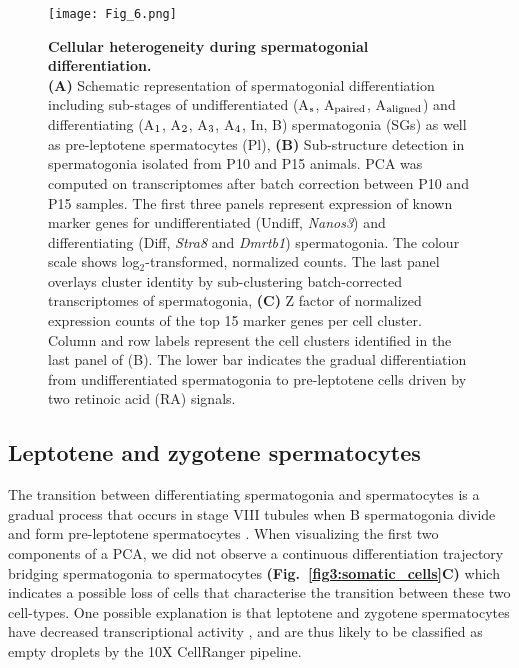 \begin{figure}[!h]
\centering
\texttt{[image: Fig\_6.png]}
\caption[Cellular heterogeneity during spermatogonial differentiation]{\textbf{Cellular heterogeneity during spermatogonial differentiation.}\\
\textbf{(A)} Schematic representation of spermatogonial differentiation including sub-stages of undifferentiated (A$_\textnormal{s}$, A$_\textnormal{paired}$, A$_\textnormal{aligned}$) and differentiating (A$_\textnormal{1}$, A$_\textnormal{2}$, A$_\textnormal{3}$, A$_\textnormal{4}$, In, B) spermatogonia (SGs) as well as pre-leptotene spermatocytes (Pl), \textbf{(B)} Sub-structure detection in spermatogonia isolated from P10 and P15 animals. PCA was computed on transcriptomes after batch correction between P10 and P15 samples. The first three panels represent expression of known marker genes for undifferentiated (Undiff, \textit{Nanos3}) and differentiating (Diff, \textit{Stra8} and \textit{Dmrtb1}) spermatogonia. The colour scale shows log$_2$-transformed, normalized counts. The last panel overlays cluster identity by sub-clustering batch-corrected transcriptomes of spermatogonia, \textbf{(C)} Z factor of normalized expression counts of the top 15 marker genes per cell cluster. Column and row labels represent the cell clusters identified in the last panel of (B). The lower bar indicates the gradual differentiation from undifferentiated spermatogonia to pre-leptotene cells driven by two retinoic acid (RA) signals. }
\label{fig3:spermatogonia}
\end{figure}

\newpage

\subsection{Leptotene and zygotene spermatocytes}

The transition between differentiating spermatogonia and spermatocytes is a gradual process that occurs in stage VIII tubules when B spermatogonia divide and form pre-leptotene spermatocytes \citep{Anderson2008, Baltus2006}. When visualizing the first two components of a PCA, we did not observe a continuous differentiation trajectory bridging spermatogonia to spermatocytes \textbf{(Fig.~\ref{fig3:somatic_cells}C)} which indicates a possible loss of cells that characterise the transition between these two cell-types. One possible explanation is that leptotene and zygotene spermatocytes have decreased transcriptional activity \citep{Kierszenbaum1974, Monesi1965}, and are thus likely to be classified as empty droplets by the 10X CellRanger pipeline. \\

